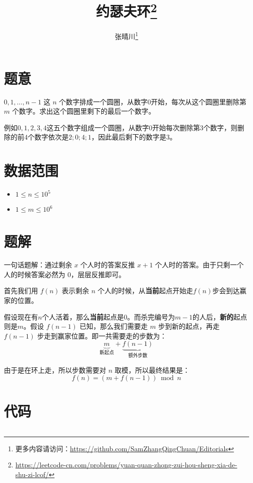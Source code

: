 \documentclass{article}
\title{约瑟夫环\footnote{\url{https://leetcode-cn.com/problems/yuan-quan-zhong-zui-hou-sheng-xia-de-shu-zi-lcof/}}}
\author{张晴川\footnote{更多内容请访问：\url{https://github.com/SamZhangQingChuan/Editorials}}}
\begin{document}
\maketitle
\section{题意}
$0,1,\ldots,n-1$ 这 $n$ 个数字排成一个圆圈，从数字$0$开始，每次从这个圆圈里删除第 $m$ 个数字。求出这个圆圈里剩下的最后一个数字。

例如$0, 1, 2, 3, 4$这五个数字组成一个圆圈，从数字$0$开始每次删除第$3$个数字，则删除的前$4$个数字依次是$2;0;4;1$，因此最后剩下的数字是$3$。


\section{数据范围}
\begin{itemize}
\item $1 \le n \le 10^5$
\item $1 \le m \le 10^6$
\end{itemize}


\section{题解}

一句话题解：通过剩余 $x$ 个人时的答案反推 $x+1$ 个人时的答案。由于只剩一个人的时候答案必然为 $0$，层层反推即可。


首先我们用 $f(n)$ 表示剩余 $n$ 个人的时候，从\textbf{当前}起点开始走$f(n)$步会到达赢家的位置。


假设现在有$n$个人活着，那么\textbf{当前}起点是$0$。而杀完编号为$m-1$的人后，\textbf{新的}起点则是$m$。假设 $f(n-1)$ 已知，那么我们需要走 $m$ 步到新的起点，再走 $f(n-1)$ 步走到赢家位置。即一共需要走的步数为： 
$$
\underbrace{m}_{\text{新起点}} + \underbrace{f(n-1)}_{\text{额外步数}}
$$

由于是在环上走，所以步数需要对 $n$ 取模，所以最终结果是：
$$
f(n) = (m + f(n-1)) \bmod {n}
$$


\section{代码}
\inputminted[linenos,autogobble]{cpp}{Josephus.cpp}
\end{document}
